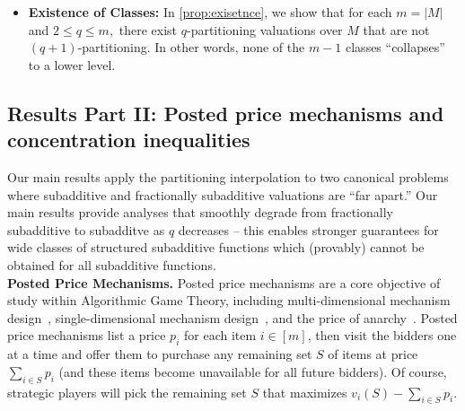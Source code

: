 \documentclass[11pt]{article}%
\numberwithin{theorem}{subsection}
\begin{document}
\begin{itemize}[noitemsep]
    \item \textbf{Existence of Classes:} In \cref{prop:exisetnce}, we show that for each $m = |M|$ and $2\le q \le m,$ there exist $q$-partitioning valuations over $M$ that are not $(q+1)$-partitioning. In other words, none of the $m-1$ classes ``collapses'' to a lower level.
\end{itemize}

\subsection{Results Part II: Posted price mechanisms and concentration inequalities}

Our main results apply the partitioning interpolation to two canonical problems where subadditive and fractionally subadditive valuations are ``far apart.'' Our main results provide analyses that smoothly degrade from fractionally subadditive to subadditve as $q$ decreases -- this enables stronger guarantees for wide classes of structured subadditive functions which (provably) cannot be obtained for all subadditive functions.\\

\noindent\textbf{Posted Price Mechanisms.} Posted price mechanisms are a core objective of study within Algorithmic Game Theory, including multi-dimensional mechanism design~\cite{ChawlaHMS10}, single-dimensional mechanism design~\cite{Yan11,AlaeiHNPY15}, and the price of anarchy~\cite{FeldmanGL15, DuttingFKL20}. Posted price mechanisms list a price $p_i$ for each item $i \in [m]$, then visit the bidders one at a time and offer them to purchase any remaining set $S$ of items at price $\sum_{i \in S} p_i$ (and these items become unavailable for all future bidders). Of course, strategic players will pick the remaining set $S$ that maximizes $v_i(S) - \sum_{i \in S} p_i$. 
\end{document}
